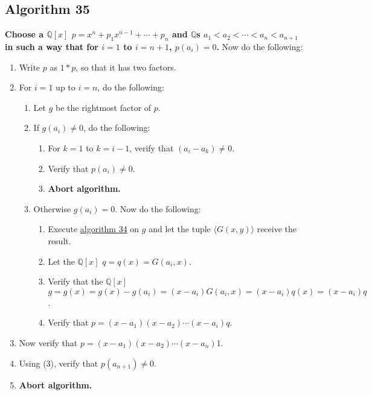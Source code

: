 \documentclass[twocolumn]{article}
\begin{document}
		\subsection{Algorithm 35}\label{sec:algorithm 35}
			\textbf{Choose a $\mathbb{Q}[x]$ $p=x^n+p_1x^{n-1}+\cdots+p_n$ and $\mathbb{Q}$s $a_1<a_2<\cdots<a_n<a_{n+1}$ in such a way that for $i=1$ to $i=n+1$, $p(a_i)=0$.} Now do the following:
			\begin{enumerate}
				\item Write $p$ as $1*p$, so that it has two factors.
				\item For $i=1$ up to $i=n$, do the following:
				\begin{enumerate}
					\item Let $g$ be the rightmost factor of $p$.
					\item If $g(a_i)\ne 0$, do the following:
					\begin{enumerate}
						\item For $k=1$ to $k=i-1$, verify that $(a_i-a_k)\ne 0$.
						\item Verify that $p(a_i)\ne 0$.
						\item \textbf{Abort algorithm.}
					\end{enumerate}
					\item Otherwise $g(a_i)=0$. Now do the following:
					\begin{enumerate}
						\item Execute \hyperref[sec:algorithm 34]{algorithm 34} on $g$ and let the tuple $\langle G(x,y)\rangle$ receive the result.
						\item Let the $\mathbb{Q}[x]$ $q=q(x)=G(a_i,x)$.
						\item Verify that the $\mathbb{Q}[x]$ $g=g(x)=g(x)-g(a_i)=(x-a_i)G(a_i,x)=(x-a_i)q(x)=(x-a_i)q$.
						\item Verify that $p=(x-a_1)(x-a_2)\cdots(x-a_i)q$.
					\end{enumerate}
				\end{enumerate}
				\item Now verify that $p=(x-a_1)(x-a_2)\cdots(x-a_n)1$.
				\item Using (3), verify that $p(a_{n+1})\ne 0$.
				\item \textbf{Abort algorithm.}
			\end{enumerate}
\end{document}
